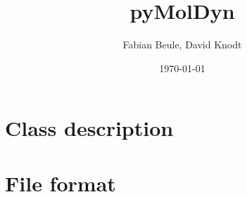 \documentclass[final, oneside, a4paper, 11pt, pdftex, english]{scrreprt}
\begin{document}
\title{pyMolDyn}
\author{Fabian Beule, David Knodt}
\date{\today}
\maketitle

\tableofcontents


\chapter{Class description}






\chapter{File format}

\end{document}
